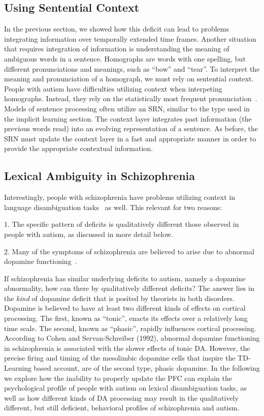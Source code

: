%
%

\subsection{Using Sentential Context}
In the previous section, we showed how this deficit can lead to problems integrating information over temporally extended time frames.  Another situation that requires integration of information is understanding the meaning of ambiguous words in a sentence.  Homographs are words with one spelling, but different pronunciations and meanings, such as ``bow'' and ``tear''.  To interpret the meaning and pronunciation of a homograph, we must rely on sentential context. People with autism have difficulties utilizing context when interpeting homographs.  Instead, they rely on the statistically most frequent pronunciation~\cite{HappeF:1997:WCC_Homographs}.  Models of sentence processing often utilize an SRN, similar to the type used in the implicit learning section. The context layer integrates past information (the previous words read) into an evolving representation of a sentence.  As before, the SRN must update the context layer in a fast and appropriate manner in order to provide the appropriate contextual information.  

\subsection{Lexical Ambiguity in Schizophrenia}
Interestingly, people with schizophrenia have problems utilizing context in language disambiguation tasks~\cite{CohenJD:1992:Schizophrenia} as well.  This relevant for two reasons:

1.  The specific pattern of deficits is qualitatively different those observed in people with autism, as discussed in more detail below.

2.  Many of the symptoms of schizophrenia are believed to arise due to abnormal dopamine functioning~\cite{CohenJD:1992:Schizophrenia}.  

If schizophrenia has similar underlying deficits to autism, namely a dopamine abnormality, how can there by qualitatively different deficits?  The answer lies in the \emph{kind} of dopamine deficit that is posited by theorists in both disorders.  Dopamine is believed to have at least two different kinds of effects on cortical processing.  The first, known as ``tonic'', enacts its effects over a relatively long time scale.  The second, known as ``phasic'', rapidly influences cortical processing.  According to Cohen and Servan-Schreiber (1992), abnormal dopamine functioning in schizophrenia is associated with the slower effects of tonic DA.  However, the precise firing and timing of the mesolimbic dopamine cells that inspire the TD-Learning based account, are of the second type, phasic dopamine.  In the following we explore how the inability to properly update the PFC can explain the psychological profile of people with autism on lexical disambiguation tasks, as well as how different kinds of DA processing may result in the qualitatively different, but still deficient, behavioral profiles of schizophrenia and autism. 

